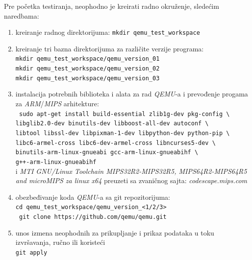 \documentclass[12pt,oneside]{memoir}
\newcommand{\kod}[1]{\texttt{#1}}
\newcommand{\strano}[1]{\textit{#1}}
\begin{document}
Pre početka testiranja, neophodno je kreirati radno okruženje, sledećim naredbama:
\begin{enumerate}
\item kreiranje radnog direktorijuma: \kod{mkdir qemu\_test\_workspace}
\item kreiranje tri bazna direktorijuma za različite verzije programa: \\
\kod{mkdir qemu\_test\_workspace/qemu\_version\_01} \\ \kod{mkdir qemu\_test\_workspace/qemu\_version\_02} \\ \kod{mkdir qemu\_test\_workspace/qemu\_version\_03} 
\item instalacija potrebnih biblioteka i alata za rad \strano{QEMU}-a i prevođenje progama za \strano{ARM}/\strano{MIPS} arhitekture: \\
\kod{ sudo apt-get install build-essential zlib1g-dev pkg-config \textbackslash } \\
\hspace*{6mm} \kod{libglib2.0-dev binutils-dev libboost-all-dev autoconf \textbackslash } \\
\hspace*{6mm} \kod{libtool libssl-dev libpixman-1-dev libpython-dev python-pip \textbackslash } \\
\hspace*{6mm} \kod{libc6-armel-cross libc6-dev-armel-cross libncurses5-dev \textbackslash } \\
\hspace*{6mm} \kod{binutils-arm-linux-gnueabi gcc-arm-linux-gnueabihf \textbackslash } \\
\hspace*{6mm} \kod{g++-arm-linux-gnueabihf} \\
i \strano{MTI GNU/Linux Toolchain MIPS32R2-MIPS32R5, MIPS64R2-MIPS64R5 and microMIPS za linux x64} preuzeti sa zvaničnog sajta: \strano{codescape.mips.com}
\item obezbeđivanje koda \strano{QEMU}-a sa git repozitorijuma: \\
\kod{cd qemu\_test\_workspace/qemu\_version\_<1/2/3>} \\
\kod{ git clone https://github.com/qemu/qemu.git}
\item unos izmena neophodnih za prikupljanje i prikaz podataka u toku izvršavanja, ručno ili koristeći \\
\kod{git apply}


\end{enumerate}
\end{document}
